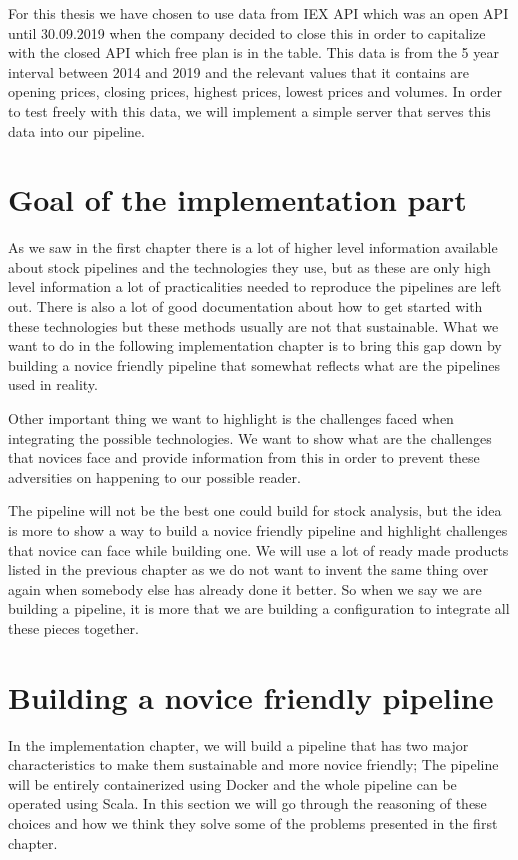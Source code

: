 For this thesis we have chosen to use data from IEX API which was an open API until 30.09.2019 when the company decided to close this in order to capitalize with the closed API which free plan is in the table.
This data is from the 5 year interval between 2014 and 2019 and the relevant values that it contains are opening prices, closing prices, highest prices, lowest prices and volumes.
In order to test freely with this data, we will implement a simple server that serves this data into our pipeline.

\section{Goal of the implementation part}

As we saw in the first chapter there is a lot of higher level information available about stock pipelines and the technologies they use, but as these are only high level information a lot of practicalities needed to reproduce the pipelines are left out.
There is also a lot of good documentation about how to get started with these technologies but these methods usually are not that sustainable.
What we want to do in the following implementation chapter is to bring this gap down by building a novice friendly pipeline that somewhat reflects what are the pipelines used in reality.

Other important thing we want to highlight is the challenges faced when integrating the possible technologies.
We want to show what are the challenges that novices face and provide information from this in order to prevent these adversities on happening to our possible reader.

The pipeline will not be the best one could build for stock analysis, but the idea is more to show a way to build a novice friendly pipeline and highlight challenges that novice can face while building one.
We will use a lot of ready made products listed in the previous chapter as we do not want to invent the same thing over again when somebody else has already done it better.
So when we say we are building a pipeline, it is more that we are building a configuration to integrate all these pieces together.

\section{Building a novice friendly pipeline}

In the implementation chapter, we will build a pipeline that has two major characteristics to make them sustainable and more novice friendly;
The pipeline will be entirely containerized using Docker and the whole pipeline can be operated using Scala.
In this section we will go through the reasoning of these choices and how we think they solve some of the problems presented in the first chapter.

